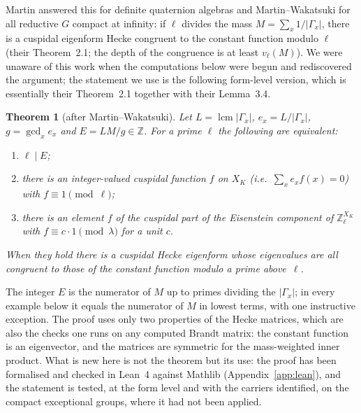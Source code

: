 \documentclass[11pt]{amsart}
\newtheorem{theorem}{Theorem}[section]
\theoremstyle{definition}
\newcommand{\Z}{\mathbb{Z}}\newcommand{\Q}{\mathbb{Q}}\newcommand{\R}{\mathbb{R}}\newcommand{\A}{\mathbb{A}}\newcommand{\F}{\mathbb{F}}
\begin{document}
Martin \cite{Mar17} answered this for definite quaternion algebras and Martin--Wakatsuki \cite{MW24} for all reductive $G$ compact at infinity: if $\ell$ divides the mass $M=\sum_x1/|\Gamma_x|$, there is a cuspidal eigenform Hecke congruent to the constant function modulo $\ell$ (their Theorem~2.1; the depth of the congruence is at least $v_\ell(M)$). We were unaware of this work when the computations below were begun and rediscovered the argument; the statement we use is the following form-level version, which is essentially their Theorem~2.1 together with their Lemma~3.4.

\begin{theorem}[after Martin--Wakatsuki]\label{thm:main}
Let $L=\operatorname{lcm}|\Gamma_x|$, $e_x=L/|\Gamma_x|$, $g=\gcd_x e_x$ and $E=L M/g\in\Z$. For a prime $\ell$ the following are equivalent:
\begin{enumerate}
\item[(i)] $\ell\mid E$;
\item[(ii)] there is an integer-valued cuspidal function $f$ on $X_K$ (i.e.\ $\sum_x e_x f(x)=0$) with $f\equiv1\pmod\ell$;
\item[(iii)] there is an element $f$ of the cuspidal part of the Eisenstein component of $\Z_\ell^{X_K}$ with $f\equiv c\cdot1\pmod\lambda$ for a unit $c$.
\end{enumerate}
When they hold there is a cuspidal Hecke eigenform whose eigenvalues are all congruent to those of the constant function modulo a prime above~$\ell$.
\end{theorem}
The integer $E$ is the numerator of $M$ up to primes dividing the $|\Gamma_x|$; in every example below it equals the numerator of $M$ in lowest terms, with one instructive exception. The proof uses only two properties of the Hecke matrices, which are also the checks one runs on any computed Brandt matrix: the constant function is an eigenvector, and the matrices are symmetric for the mass-weighted inner product. What is new here is not the theorem but its use: the proof has been formalised and checked in Lean~4 against Mathlib (Appendix~\ref{app:lean}), and the statement is tested, at the form level and with the carriers identified, on the compact exceptional groups, where it had not been applied.
\end{document}
